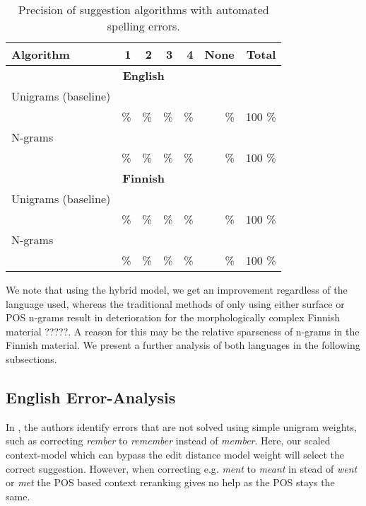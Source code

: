 \documentclass{llncs}
\begin{document}
\begin{table*}
    \caption{Precision of suggestion algorithms with automated spelling errors.
    \label{table:fake-eval}}
  \begin{center}
      \begin{tabular}{lrrrrrr}
        \hline
        Algorithm & 1 & 2 & 3 & 4 & None & Total \\
        \hline
        \multicolumn{7}{c}{\textbf{English}} \\
        \hline
        Unigrams          (baseline)
 &     &       &      &      &        &     \\
 &  \% &    \% &   \% &   \% &    \%  & 100 \% \\
        \hline
        N-grams
&       &      &      &      &       &     \\
&    \% &   \% &   \% &   \% &    \% & 100 \% \\
        \hline
        \multicolumn{7}{c}{\textbf{Finnish}} \\
        \hline
        Unigrams        (baseline)
   &     &       &      &      &       &     \\
 &  \% &    \% &   \% &   \% &    \% & 100 \% \\
        \hline
        N-grams 
&       &      &      &      &       &     \\
 &    \% &   \% &   \% &   \% &    \% & 100 \% \\
        \hline
      \end{tabular}
  \end{center}
\end{table*}

We note that using the hybrid model, we get an improvement regardless
of the language used, whereas the traditional methods of only using either surface 
or POS n-grams result in deterioration for the morphologically complex Finnish material ?????. A reason
for this may be the relative sparseness of n-grams in the Finnish
material. We present a further analysis of both languages in the following 
subsections.

\subsection{English Error-Analysis}

In \cite{norvig/2010}, the authors identify errors that are not solved using simple
unigram weights, such as correcting \emph{rember} to \emph{remember} instead of
\emph{member}. Here, our scaled context-model which can bypass the edit distance
model weight will select the correct suggestion. However, when correcting e.g.
\emph{ment} to \emph{meant} in stead of \emph{went} or \emph{met} the POS
based context reranking gives no help as the POS stays the same.
 
\end{document}
